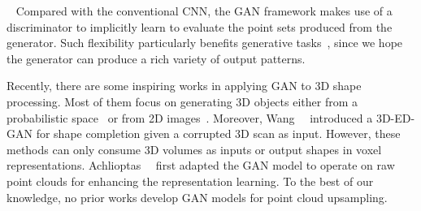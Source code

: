  \
Compared with the conventional CNN, the GAN framework makes use of a discriminator to implicitly learn to evaluate the point sets produced from the generator.
%
Such flexibility particularly benefits generative tasks~\cite{ledig2017photo,isola2017image,zhang2017stackgan}, since we hope the generator can produce a rich variety of output patterns.
%

Recently, there are some inspiring works in applying GAN to 3D shape processing.
Most of them focus on generating 3D objects either from a probabilistic space~\cite{wu2016learning} or from 2D images~\cite{yang20173d,gwak2017weakly,smith2017improved}.
Moreover, Wang~\etal~\cite{wang2017shape} introduced a 3D-ED-GAN for shape completion given a corrupted 3D scan as input.
However, these methods can only consume 3D volumes as inputs or output shapes in voxel representations.
%
Achlioptas~\etal~\cite{achlioptas2018learning} first adapted the GAN model to operate on raw point clouds for enhancing the representation learning.
%
To the best of our knowledge, no prior works develop GAN models for point cloud upsampling.
